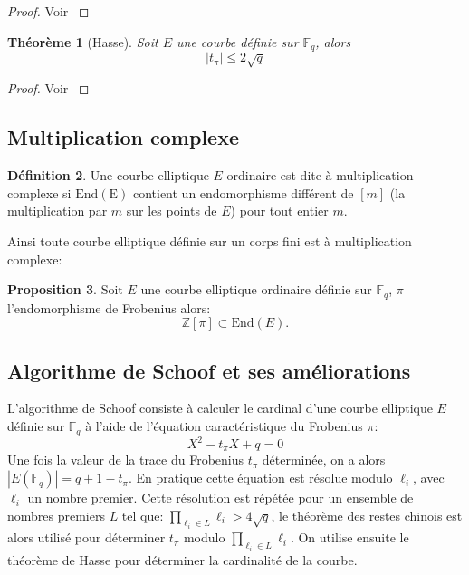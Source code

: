 \documentclass[10pt,a4paper]{book}
\theoremstyle{plain}
\newtheorem{thm}{Théorème}[chapter]
\theoremstyle{definition}
\theoremstyle{definition}
\theoremstyle{definition}
\newtheorem{prop}[thm]{Proposition}
\theoremstyle{definition}
\newtheorem{defi}[thm]{Définition}
\theoremstyle{remark}
\theoremstyle{remark}
\theoremstyle{definition}
\begin{document}
\begin{proof}
Voir \cite[Theorem V.1.1]{Silv1}
\end{proof}

\begin{thm}[Hasse]
Soit $E$ une courbe définie sur $\mathbb{F}_q$, alors 
\begin{equation}
|t_{\pi}| \leqslant 2 \sqrt{q}
\end{equation}
\end{thm}

\begin{proof}
Voir \cite[Theorem V.1.1]{Silv1}
\end{proof}





\subsection{Multiplication complexe}

\begin{defi}
Une courbe elliptique $E$ ordinaire est dite à multiplication complexe si $\mathrm{End(E)}$ contient un endomorphisme différent de $[m]$ (la multiplication par $m$ sur les points de $E$) pour tout entier $m$. 
\end{defi} 

Ainsi toute courbe elliptique définie sur un corps fini est à multiplication complexe:

\begin{prop}
Soit $E$ une courbe elliptique ordinaire définie sur $\mathbb{F}_q$, $\pi$ l'endomorphisme de Frobenius alors: 
\[
\mathbb{Z}[\pi] \subset \mathrm{End}(E).
\]
\end{prop}


\subsection{Algorithme de Schoof et ses améliorations}

L'algorithme de Schoof \cite{Schoof85} consiste à calculer le cardinal d'une courbe elliptique $E$ définie sur $\mathbb{F}_q$ à l'aide de l'équation caractéristique du Frobenius $\pi$:
\begin{equation*}
X^2-t_{\pi}X+q=0
\end{equation*}
Une fois la valeur de la trace du Frobenius $t_{\pi}$ déterminée, on a alors $|E(\mathbb{F}_q)|=q+1-t_{\pi}$. En pratique cette équation est résolue modulo $\ell_i$, avec $\ell_i$ un nombre premier. Cette résolution est répétée pour un ensemble de nombres premiers $L$ tel que: $\prod_{\ell_i \in L}\ell_i>4 \sqrt{q}$, le théorème des restes chinois est alors utilisé pour déterminer $t_{\pi}$ modulo $\prod_{\ell_i \in L}\ell_i$. On utilise ensuite le théorème de Hasse pour déterminer la cardinalité de la courbe.
\end{document}
